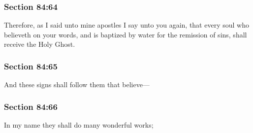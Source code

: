 	\subsubsection{Section 84:64} %
		\label{DC84-64}

		Therefore, as I said unto mine apostles I say unto you again, that every soul who believeth on your words, and is baptized by water for the remission of sins, shall receive the Holy Ghost.


	\subsubsection{Section 84:65} %
		\label{DC84-65}

		And these signs shall follow them that believe---


	\subsubsection{Section 84:66} %
		\label{DC84-66}

		In my name they shall do many wonderful works;


